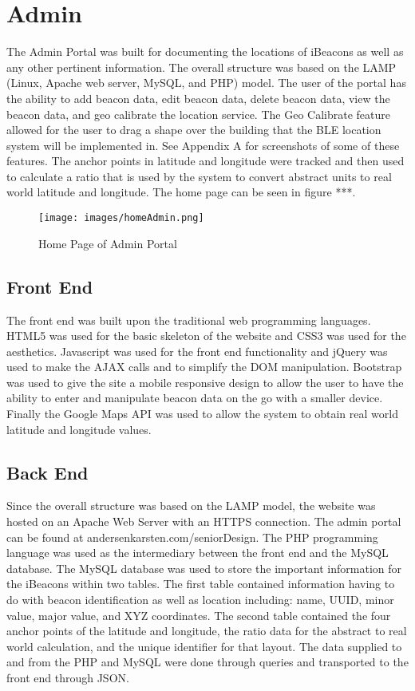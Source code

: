 \section{Admin}
The Admin Portal was built for documenting the locations of iBeacons as well as any other pertinent information. The overall
structure was based on the LAMP (Linux, Apache web server, MySQL, and PHP) model. The user of the portal has the ability to add beacon data, edit beacon data,
delete beacon data, view the beacon data, and geo calibrate the location service. The Geo Calibrate feature allowed for the
user to drag a shape over the building that the BLE location system will be implemented in. See Appendix A for screenshots of some of these features. The anchor points in latitude
and longitude were tracked and then used to calculate a ratio that is used by the system to convert abstract units to
real world latitude and longitude. The home page can be seen in figure ***.

\begin{figure}[h]
\texttt{[image: images/homeAdmin.png]}
\caption{Home Page of Admin Portal}
\end{figure}

\subsection{Front End}
The front end was built upon the traditional web programming languages. HTML5 was used for the basic skeleton of the website
and CSS3 was used for the aesthetics. Javascript was used for the front end functionality and jQuery was used to make the AJAX calls
and to simplify the DOM manipulation. Bootstrap was used to give the site a mobile responsive design to allow the user to have the ability
to enter and manipulate beacon data on the go with a smaller device. Finally the Google Maps API was used to allow the system to obtain
real world latitude and longitude values.

\subsection{Back End}
Since the overall structure was based on the LAMP model, the website was hosted on an Apache Web Server with an HTTPS connection. The admin portal can be
found at andersenkarsten.com/seniorDesign. The PHP programming language was used as the intermediary between the front end and the MySQL database.
The MySQL database was used to store the important information for the iBeacons within two tables. The first table contained information having to do with beacon identification as well as location including:
name, UUID, minor value, major value, and XYZ coordinates. The second table contained the four anchor points of the latitude and longitude, the ratio data for the abstract to real world calculation, and the unique identifier for that layout.
The data supplied to and from the PHP and MySQL were done through queries and transported to the front end through JSON.
